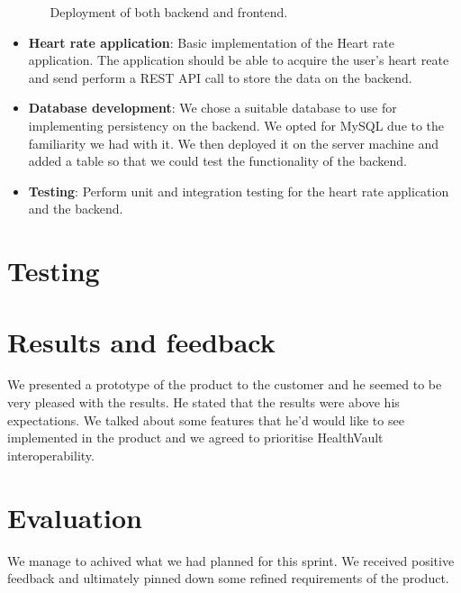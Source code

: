 \begin{itemize}
\begin{itemize}
			Deployment of both backend and frontend.
	\end{itemize}
	\item \textbf{Heart rate application}:
		Basic implementation of the Heart rate application. The application should be able to acquire
		the user's heart reate and send perform a REST API call to store the data on the backend.
	\item \textbf{Database development}:
		We chose a suitable database to use for implementing persistency on the backend.
		We opted for MySQL due to the familiarity we had with it. We then deployed it on the server machine
		and added a table so that we could test the functionality of the backend.
	\item \textbf{Testing}:
		Perform unit and integration testing for the heart rate application and the backend.
\end{itemize}

\section{Testing}

\section{Results and feedback}
We presented a prototype of the product to the customer and he seemed to be very pleased with the results.
He stated that the results were above his expectations.
We talked about some features that he'd would like to see implemented in the product
and we agreed to prioritise HealthVault interoperability.

\section{Evaluation}
We manage to achived what we had planned for this sprint.
We received positive feedback and ultimately pinned down some refined requirements of the product.